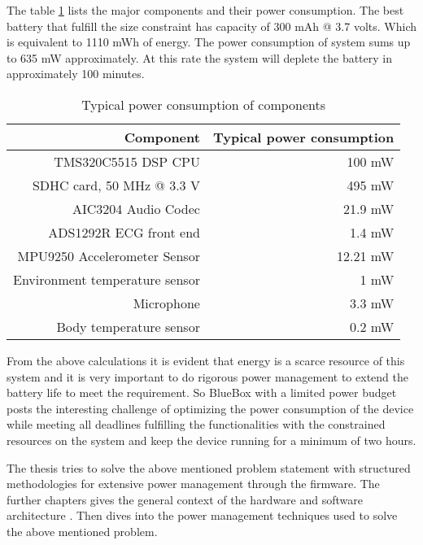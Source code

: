 The table \ref{table:power_rating} lists the major components and their power consumption. The best battery that fulfill the size constraint has capacity of 300 mAh @ 3.7 volts. Which is equivalent to 1110 mWh of energy. The power consumption of system sums up to 635 mW approximately. At this rate the system will deplete the battery in approximately 100 minutes. 
\begin{table}[h]
	\centering
	\begin{tabular}{|r|r|}
		\hline
		Component & Typical power consumption\\
		\hline
		TMS320C5515 DSP CPU &  100 mW \\
		SDHC card, 50 MHz @ 3.3 V   &  495 mW \\
		AIC3204 Audio Codec  &  21.9 mW \\	
		ADS1292R ECG front end & 1.4 mW \\
		MPU9250 Accelerometer Sensor &  12.21 mW \\
		Environment temperature sensor  &  1 mW \\
		Microphone  & 3.3 mW \\
		Body temperature sensor  &  0.2 mW \\	
		\hline
	\end{tabular}
	\caption{Typical power consumption of components}
	\label{table:power_rating}
\end{table}

From the above  calculations it is evident that energy is a scarce resource of this system and it is very important to do rigorous power management to extend the battery life to meet the requirement. So BlueBox with a limited power budget posts the interesting challenge of optimizing the power consumption of the  device while meeting all deadlines fulfilling the functionalities with the constrained resources on the system and keep the device running for a minimum of two hours.

The thesis tries to solve the above mentioned problem statement with structured methodologies for extensive power management through the firmware. The further chapters gives the general context of the hardware and software architecture . Then dives into the power management techniques used to solve the above mentioned problem.


